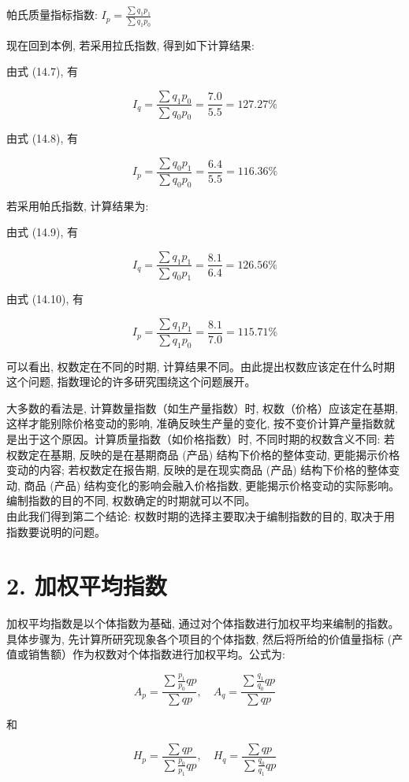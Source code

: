 \documentclass[10pt]{article}
\begin{document}
\begin{CJK*}{UTF8}{bsmi}
帕氏质量指标指数: $I_{p}=\frac{\sum q_{1} p_{1}}{\sum q_{1} p_{0}}$

现在回到本例, 若采用拉氏指数, 得到如下计算结果:

由式 (14.7), 有

$$
I_{q}=\frac{\sum q_{1} p_{0}}{\sum q_{0} p_{0}}=\frac{7.0}{5.5}=127.27 \%
$$

由式 (14.8), 有

$$
I_{p}=\frac{\sum q_{0} p_{1}}{\sum q_{0} p_{0}}=\frac{6.4}{5.5}=116.36 \%
$$

若采用帕氏指数, 计算结果为:

由式 (14.9), 有

$$
I_{q}=\frac{\sum q_{1} p_{1}}{\sum q_{0} p_{1}}=\frac{8.1}{6.4}=126.56 \%
$$

由式 (14.10), 有

$$
I_{p}=\frac{\sum q_{1} p_{1}}{\sum q_{1} p_{0}}=\frac{8.1}{7.0}=115.71 \%
$$

可以看出, 权数定在不同的时期, 计算结果不同。由此提出权数应该定在什么时期这个问题, 指数理论的许多研究围绕这个问题展开。

大多数的看法是, 计算数量指数（如生产量指数）时, 权数（价格）应该定在基期,这样才能别除价格变动的影响, 准确反映生产量的变化, 按不变价计算产量指数就是出于这个原因。计算质量指数（如价格指数）时, 不同时期的权数含义不同: 若权数定在基期, 反映的是在基期商品 (产品) 结构下价格的整体变动, 更能揭示价格变动的内容; 若权数定在报告期, 反映的是在现实商品 (产品) 结构下价格的整体变动, 商品 (产品) 结构变化的影响会融入价格指数, 更能揭示价格变动的实际影响。编制指数的目的不同, 权数确定的时期就可以不同。\\
由此我们得到第二个结论: 权数时期的选择主要取决于编制指数的目的, 取决于用指数要说明的问题。

\section*{2. 加权平均指数}
加权平均指数是以个体指数为基础, 通过对个体指数进行加权平均来编制的指数。具体步骤为, 先计算所研究现象各个项目的个体指数, 然后将所给的价值量指标 (产值或销售额）作为权数对个体指数进行加权平均。公式为:


\begin{equation*}
A_{p}=\frac{\sum \frac{p_{1}}{p_{0}} q p}{\sum q p}, \quad A_{q}=\frac{\sum \frac{q_{1}}{q_{0}} q p}{\sum q p} \tag{14.11}
\end{equation*}


和


\begin{equation*}
H_{p}=\frac{\sum q p}{\sum \frac{p_{0}}{p_{1}} q p}, \quad H_{q}=\frac{\sum q p}{\sum \frac{q_{0}}{q_{1}} q p} \tag{14.12}
\end{equation*}



\end{CJK*}
\end{document}
